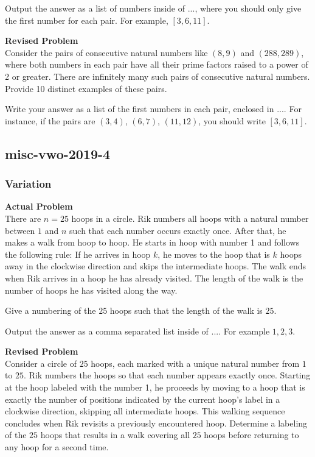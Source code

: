 Output the answer as a list of numbers inside of $\boxed{...}$, where you should only give the first number for each pair. For example, $\boxed{[3, 6, 11]}$.

\textbf{Revised Problem}\\
Consider the pairs of consecutive natural numbers like $(8,9)$ and $(288,289)$, where both numbers in each pair have all their prime factors raised to a power of 2 or greater. There are infinitely many such pairs of consecutive natural numbers. 
Provide 10 distinct examples of these pairs.

Write your answer as a list of the first numbers in each pair, enclosed in $\boxed{...}$. For instance, if the pairs are $(3,4)$, $(6,7)$, $(11,12)$, you should write $\boxed{[3, 6, 11]}$.

\subsection{misc-vwo-2019-4}
\subsubsection{Variation}
\textbf{Actual Problem}\\
There are $n = 25$ hoops in a circle. Rik numbers all hoops with a natural number between $1$ and $n$ such that each number occurs exactly once. After that, he makes a walk from hoop to hoop. He starts in hoop with number 1 and follows the following rule: If he arrives in hoop $k$, he moves to the hoop that is $k$ hoops away in the clockwise direction and skips the intermediate hoops. The walk ends when Rik arrives in a hoop he has already visited. The length of the walk is the number of hoops he has visited along the way.

Give a numbering of the $25$ hoops such that the length of the walk is $25$.

Output the answer as a comma separated list inside of $\boxed{...}$. For example $\boxed{1, 2, 3}$.

\textbf{Revised Problem}\\
Consider a circle of $25$ hoops, each marked with a unique natural number from $1$ to $25$. Rik numbers the hoops so that each number appears exactly once. Starting at the hoop labeled with the number 1, he proceeds by moving to a hoop that is exactly the number of positions indicated by the current hoop's label in a clockwise direction, skipping all intermediate hoops. This walking sequence concludes when Rik revisits a previously encountered hoop. Determine a labeling of the $25$ hoops that results in a walk covering all $25$ hoops before returning to any hoop for a second time.

